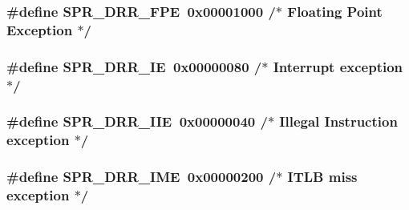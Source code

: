 \hypertarget{spr-defs_8h_aea52311af6cf3a5ed04d846d829e9f5c}{
\subsubsection[{\-S\-P\-R\-\_\-\-D\-R\-R\-\_\-\-F\-P\-E}]{\setlength{\rightskip}{0pt plus 5cm}\#define {\bf \-S\-P\-R\-\_\-\-D\-R\-R\-\_\-\-F\-P\-E}~0x00001000  /$\ast$ Floating Point Exception $\ast$/}}\label{spr-defs_8h_aea52311af6cf3a5ed04d846d829e9f5c}
\hypertarget{spr-defs_8h_a5c11b1b617f0aead6d34800f7db4c3d1}{
\subsubsection[{\-S\-P\-R\-\_\-\-D\-R\-R\-\_\-\-I\-E}]{\setlength{\rightskip}{0pt plus 5cm}\#define {\bf \-S\-P\-R\-\_\-\-D\-R\-R\-\_\-\-I\-E}~0x00000080  /$\ast$ Interrupt exception $\ast$/}}\label{spr-defs_8h_a5c11b1b617f0aead6d34800f7db4c3d1}
\hypertarget{spr-defs_8h_a3b6f28c9d8f140eb046f551a5c75c39a}{
\subsubsection[{\-S\-P\-R\-\_\-\-D\-R\-R\-\_\-\-I\-I\-E}]{\setlength{\rightskip}{0pt plus 5cm}\#define {\bf \-S\-P\-R\-\_\-\-D\-R\-R\-\_\-\-I\-I\-E}~0x00000040  /$\ast$ Illegal Instruction exception $\ast$/}}\label{spr-defs_8h_a3b6f28c9d8f140eb046f551a5c75c39a}
\hypertarget{spr-defs_8h_a532a1222a97c0556f854bc5edb858fcf}{
\subsubsection[{\-S\-P\-R\-\_\-\-D\-R\-R\-\_\-\-I\-M\-E}]{\setlength{\rightskip}{0pt plus 5cm}\#define {\bf \-S\-P\-R\-\_\-\-D\-R\-R\-\_\-\-I\-M\-E}~0x00000200  /$\ast$ I\-T\-L\-B miss exception $\ast$/}}\label{spr-defs_8h_a532a1222a97c0556f854bc5edb858fcf}
